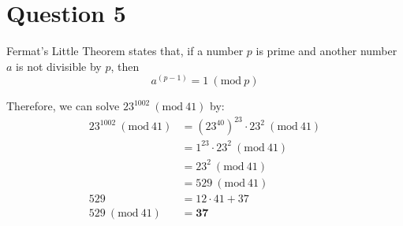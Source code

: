 \documentclass[letterpaper, 12pt]{article}
\newcommand{\PMod}[1]{\ (\mathrm{mod}\ #1)}
\begin{document}
\section*{Question 5}
Fermat's Little Theorem states that, if a number $p$ is prime and another number $a$ is not divisible by $p$, then
\[a^{(p-1)} = 1 \PMod{p}\]

Therefore, we can solve $23^{1002} \PMod{41}$ by:
\begin{align*}
    23^{1002} \PMod{41} &= (23^{40})^{23} \cdot 23^2 \PMod{41}\\
    &= 1^{23} \cdot 23^2 \PMod{41}\\
    &= 23^2 \PMod{41}\\
    &= 529 \PMod{41}\\
    529 &= 12 \cdot 41 + 37\\
    529 \PMod{41} &= \boxed{\mathbf{37}}
\end{align*}
\end{document}
